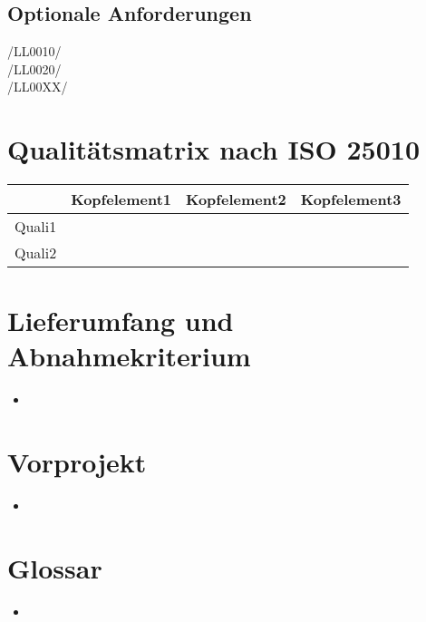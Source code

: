 \documentclass[11pt,a4paper]{scrreprt}
\begin{document}
\section{Optionale Anforderungen}
\begin{description}
\item[/LL0010/]
\item[/LL0020/]
\item[/LL00XX/]
\end{description}

\chapter{Qualitätsmatrix nach ISO 25010}
\begin{tabular}{|l|c|c|c|}
\hline
		& Kopfelement1 & Kopfelement2 & Kopfelement3 \\
\hline
Quali1  &              &              &              \\     
Quali2  &              &              &              \\     
\hline
\end{tabular}

\chapter{Lieferumfang und Abnahmekriterium}
\begin{itemize}
\item
\end{itemize}

\chapter{Vorprojekt}
\begin{itemize}
\item
\end{itemize}

\chapter{Glossar}
\begin{itemize}
\item
\end{itemize}
\end{document}
